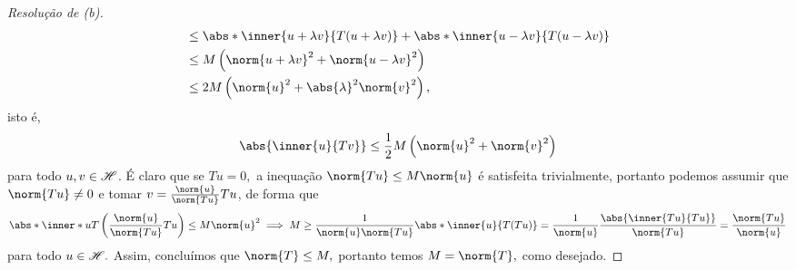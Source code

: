 \begin{proof}[Resolução de (b)]
\begin{align*}
                          &\leq \abs*{\inner{u + \lambda v}{T(u + \lambda v)}} + \abs*{\inner{u - \lambda v}{T(u - \lambda v)}}\\
                          &\leq M \left(\norm{u + \lambda v}^2 + \norm{u - \lambda v}^2\right)\\
                          &\leq 2M \left(\norm{u}^2 + \abs{\lambda}^2 \norm{v}^2\right),
  \end{align*}
  isto é,
  \begin{equation*}
    \abs{\inner{u}{Tv}} \leq \frac12 M \left(\norm{u}^2 + \norm{v}^2\right)
  \end{equation*}
  para todo \(u, v \in \mathscr{H}\). É claro que se \(Tu = 0,\) a inequação \(\norm{Tu} \leq M \norm{u}\) é satisfeita trivialmente, portanto podemos assumir que \(\norm{Tu} \neq 0\) e tomar \(v = \frac{\norm{u}}{\norm{Tu}}Tu\), de forma que
  \begin{equation*}
    \abs*{\inner*{u}{T\left(\frac{\norm{u}}{\norm{Tu}}Tu\right)}} \leq M \norm{u}^2  \implies M \geq \frac{1}{\norm{u}\norm{Tu}}\abs*{\inner{u}{T(Tu)}} = \frac{1}{\norm{u}} \frac{\abs{\inner{Tu}{Tu}}}{\norm{Tu}} = \frac{\norm{Tu}}{\norm{u}}
  \end{equation*}
  para todo \(u \in \mathscr{H}.\) Assim, concluímos que \(\norm{T} \leq M,\) portanto temos \(M = \norm{T},\) como desejado.
\end{proof}
